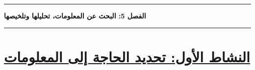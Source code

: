\documentclass[a4paper]{article}
\begin{document}


\rule{\textwidth}{1pt}

\begin{center}

{\khatt\textbf{
الفصل 5: البحث عن المعلومات، تحليلها وتلخيصها
}}

\end{center}

\rule{\textwidth}{1pt}




\section*{\khatt\underline{النشاط الأول: تحديد الحاجة إلى المعلومات}}
\end{document}
